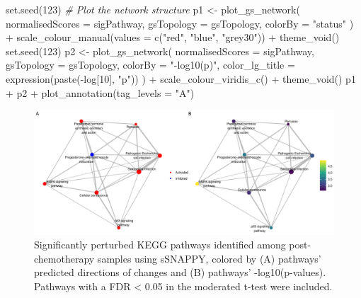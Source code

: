 \documentclass[9pt,a4paper,]{extarticle}
\newenvironment{Shaded}{\begin{snugshade}}{\end{snugshade}}
\newcommand{\AttributeTok}[1]{\textcolor[rgb]{0.77,0.63,0.00}{#1}}
\newcommand{\CommentTok}[1]{\textcolor[rgb]{0.56,0.35,0.01}{\textit{#1}}}
\newcommand{\DecValTok}[1]{\textcolor[rgb]{0.00,0.00,0.81}{#1}}
\newcommand{\FunctionTok}[1]{\textcolor[rgb]{0.00,0.00,0.00}{#1}}
\newcommand{\NormalTok}[1]{#1}
\newcommand{\OtherTok}[1]{\textcolor[rgb]{0.56,0.35,0.01}{#1}}
\newcommand{\SpecialCharTok}[1]{\textcolor[rgb]{0.00,0.00,0.00}{#1}}
\newcommand{\StringTok}[1]{\textcolor[rgb]{0.31,0.60,0.02}{#1}}
\begin{document}
\begin{Shaded}
\begin{Highlighting}[]
\FunctionTok{set.seed}\NormalTok{(}\DecValTok{123}\NormalTok{)}
\CommentTok{\# Plot the network structure}
\NormalTok{p1 }\OtherTok{\textless{}{-}} \FunctionTok{plot\_gs\_network}\NormalTok{(}
  \AttributeTok{normalisedScores =}\NormalTok{ sigPathway, }\AttributeTok{gsTopology =}\NormalTok{ gsTopology, }\AttributeTok{colorBy =} \StringTok{"status"}
\NormalTok{) }\SpecialCharTok{+}
  \FunctionTok{scale\_colour\_manual}\NormalTok{(}\AttributeTok{values =} \FunctionTok{c}\NormalTok{(}\StringTok{"red"}\NormalTok{, }\StringTok{"blue"}\NormalTok{, }\StringTok{"grey30"}\NormalTok{)) }\SpecialCharTok{+}
  \FunctionTok{theme\_void}\NormalTok{()}
\FunctionTok{set.seed}\NormalTok{(}\DecValTok{123}\NormalTok{)}
\NormalTok{p2 }\OtherTok{\textless{}{-}} \FunctionTok{plot\_gs\_network}\NormalTok{(}
  \AttributeTok{normalisedScores =}\NormalTok{ sigPathway,}
  \AttributeTok{gsTopology =}\NormalTok{ gsTopology, }
  \AttributeTok{colorBy  =} \StringTok{"{-}log10(p)"}\NormalTok{, }\AttributeTok{color\_lg\_title =} \FunctionTok{expression}\NormalTok{(}\FunctionTok{paste}\NormalTok{(}\SpecialCharTok{{-}}\NormalTok{log[}\DecValTok{10}\NormalTok{], }\StringTok{"p"}\NormalTok{))}
\NormalTok{) }\SpecialCharTok{+}
  \FunctionTok{scale\_colour\_viridis\_c}\NormalTok{() }\SpecialCharTok{+}
  \FunctionTok{theme\_void}\NormalTok{()}
\NormalTok{p1 }\SpecialCharTok{+}\NormalTok{ p2 }\SpecialCharTok{+} \FunctionTok{plot\_annotation}\NormalTok{(}\AttributeTok{tag\_levels =} \StringTok{"A"}\NormalTok{)}
\end{Highlighting}
\end{Shaded}

\begin{figure}

{\centering \includegraphics[width=1\linewidth]{sSNAPPY_paper_files/figure-latex/Figure3-1} 

}

\caption{Significantly perturbed KEGG pathways identified among post-chemotherapy samples using sSNAPPY, colored by (A) pathways’ predicted directions of changes and (B) pathways’ -log10(p-values). Pathways with a FDR < 0.05 in the moderated t-test were included.}\label{fig:Figure3}
\end{figure}
\end{document}
